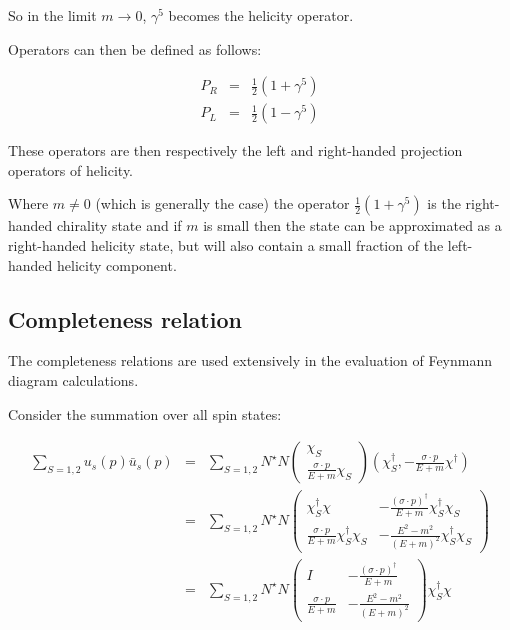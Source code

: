 So in the limit $m \to 0$, $\gamma^5$ becomes the helicity operator.

Operators can then be defined as follows:

\begin{eqnarray*}
  P_R & = & \frac{1}{2}\left(1 + \gamma^5\right) \\
  P_L & = & \frac{1}{2}\left(1 - \gamma^5\right)
\end{eqnarray*}

These operators are then respectively the left and right-handed projection operators of helicity.

Where $m\neq 0$ (which is generally the case) the operator $\frac{1}{2}\left(1 + \gamma^5\right)$ is the right-handed chirality state and if $m$ is small then the state can be approximated as a right-handed helicity state, but will also contain a small fraction of the left-handed helicity component.

\subsection{Completeness relation}

The completeness relations are used extensively in the evaluation of Feynmann diagram calculations.

Consider the summation over all spin states:

\begin{eqnarray*}
  \sum_{S = 1,2} u_s(p)\bar{u}_s(p) & = &  \sum_{S = 1,2} N^{\star}N
  \left(
    \begin{array}{c}
    \chi_S \\
    \frac{\sigma \cdot p}{E + m}\chi_S
    \end{array}
  \right)
  \left( \chi_S^{\dagger} , -\frac{\sigma\cdot p}{E + m}\chi^{\dagger} \right) \\
  & = & \sum_{S = 1,2} N^{\star}N
  \left(
    \begin{array}{cc}
    \chi_S^{\dagger}\chi & -\frac{\left(\sigma\cdot p\right)^{\dagger}}{E + m}\chi_S^{\dagger}\chi_S \\
    \frac{\sigma\cdot p}{E + m}\chi_S^{\dagger}\chi_S & -\frac{E^2 - m^2}{\left(E + m\right)^2}\chi_S^{\dagger}\chi_S
    \end{array}
  \right)
  \\
  & = & \sum_{S = 1,2}N^{\star}N
  \left(
    \begin{array}{cc}
    I & -\frac{\left(\sigma\cdot p\right)^{\dagger}}{E + m} \\
    \frac{\sigma\cdot p}{E + m} & -\frac{E^2 - m^2}{\left(E + m\right)^2}
    \end{array}
  \right)
  \chi_S^{\dagger}\chi
\end{eqnarray*}

